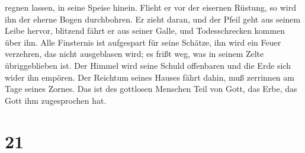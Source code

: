 regnen lassen, in seine Speise hinein.  Flieht er vor der
eisernen Rüstung, so wird ihn der eherne Bogen durchbohren.
 Er zieht daran, und der Pfeil geht aus seinem Leibe
hervor, blitzend fährt er aus seiner Galle, und Todesschrecken kommen
über ihn.  Alle Finsternis ist aufgespart für seine
Schätze, ihn wird ein Feuer verzehren, das nicht ausgeblasen wird; es
frißt weg, was in seinem Zelte übriggeblieben ist.  Der
Himmel wird seine Schuld offenbaren und die Erde sich wider ihn empören.
 Der Reichtum seines Hauses fährt dahin, muß zerrinnen am
Tage seines Zornes.  Das ist des gottlosen Menschen Teil
von Gott, das Erbe, das Gott ihm zugesprochen hat.

\hypertarget{section-20}{%
\section{21}\label{section-20}}

